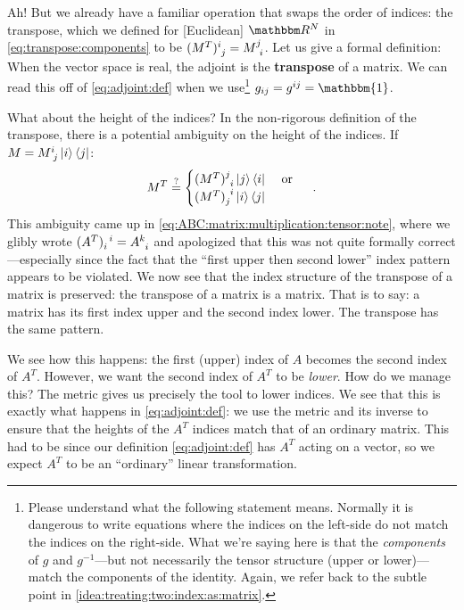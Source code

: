 \documentclass[12pt]{article}
\begin{document}
Ah! But we already have a familiar operation that swaps the order of indices: the transpose, which we defined for [Euclidean] $\RR^N$ in \eqref{eq:transpose:components} to be $(M^T)\aij{i}{j} = M\aij{j}{i}$. Let us give a formal definition: When the vector space is real, the adjoint is the \textbf{transpose} of a matrix.  
%
We can read this off of \eqref{eq:adjoint:def} when we use\footnote{Please understand what the following statement means. Normally it is dangerous to write equations where the indices on the left-side do not match the indices on the right-side. What we're saying here is that the \emph{components} of $g$ and $g^{-1}$---but not necessarily the tensor structure (upper or lower)---match the components of the identity. Again, we refer back to the subtle point in \eqref{idea:treating:two:index:as:matrix}.} $g_{ij} = g^{ij} = \mathbbm{1}$. 

What about the height of the indices? In the non-rigorous definition of the transpose, there is a potential ambiguity on the height of the indices. If $M=M\aij{i}{j}\ket{i}\bra{j}$:
\begin{align}
    M^T \stackrel{?}{=} 
    \begin{cases}
    (M^T)\aij{j}{i}\ket{j}\bra{i}    & \text{ or }\\
    (M^T)_{j}^{\phantom{j}i}\ket{i}\bra{j}
    \end{cases}
    \quad\text{.}
\end{align}
This ambiguity came up in \eqref{eq:ABC:matrix:multiplication:tensor:note}, where we glibly wrote $(A^T)_i^{\phantom{k}i} = A\aij{k}{i}$ and apologized that  this was not quite formally correct---especially since the fact that the ``first upper then second lower'' index pattern appears to be violated.  We now see that the index structure of the transpose of a matrix is preserved: the transpose of a matrix is a matrix. That is to say: a matrix has its first index upper and the second index lower. The transpose has the same pattern. 

We see how this happens: the first (upper) index of $A$ becomes the second index of $A^T$. However, we want the second index of $A^T$ to be \emph{lower}. How do we manage this? The metric gives us precisely the tool to lower indices. We see that this is exactly what happens in \eqref{eq:adjoint:def}: we use the metric and its inverse to ensure that the heights of the $A^T$ indices match that of an ordinary matrix. This had to be since our definition \eqref{eq:adjoint:def} has $A^T$ acting on a vector, so we expect $A^T$ to be an ``ordinary'' linear transformation.
\end{document}

